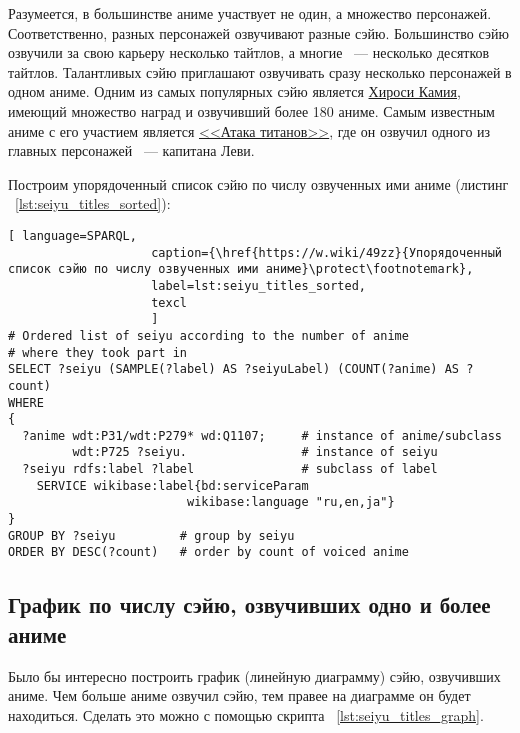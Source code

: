 Разумеется, в большинстве аниме участвует не один, а множество персонажей. Соответственно, разных персонажей озвучивают разные сэйю. Большинство сэйю озвучили за свою карьеру несколько тайтлов, а многие ~--- несколько десятков тайтлов. Талантливых сэйю приглашают озвучивать сразу несколько персонажей в одном аниме. Одним из самых популярных сэйю является \href{https://w.wiki/4L5q}{Хироси Камия}, имеющий множество наград и озвучивший более 180 аниме. Самым известным аниме с его участием является \href{https://w.wiki/4L5r}{<<Атака титанов>>}, где он озвучил одного из главных персонажей ~--- капитана Леви.

Построим упорядоченный список сэйю по числу озвученных ими аниме (листинг ~\protect\ref{lst:seiyu_titles_sorted}): 

\begin{lstlisting}[ language=SPARQL, 
                    caption={\href{https://w.wiki/49zz}{Упорядоченный список сэйю по числу озвученных ими аниме}\protect\footnotemark},
                    label=lst:seiyu_titles_sorted,
                    texcl 
                    ]
# Ordered list of seiyu according to the number of anime
# where they took part in
SELECT ?seiyu (SAMPLE(?label) AS ?seiyuLabel) (COUNT(?anime) AS ?count)
WHERE
{
  ?anime wdt:P31/wdt:P279* wd:Q1107;	 # instance of anime/subclass
         wdt:P725 ?seiyu. 	             # instance of seiyu
  ?seiyu rdfs:label ?label	             # subclass of label
    SERVICE wikibase:label{bd:serviceParam
					     wikibase:language "ru,en,ja"}
}
GROUP BY ?seiyu		    # group by seiyu 
ORDER BY DESC(?count)	# order by count of voiced anime
\end{lstlisting}%

\subsection{График по числу сэйю, озвучивших одно и более аниме}

Было бы интересно построить график (линейную диаграмму) сэйю, озвучивших аниме. Чем больше аниме озвучил сэйю, тем правее на диаграмме он будет находиться. Сделать это можно с помощью скрипта ~\protect\ref{lst:seiyu_titles_graph}.

